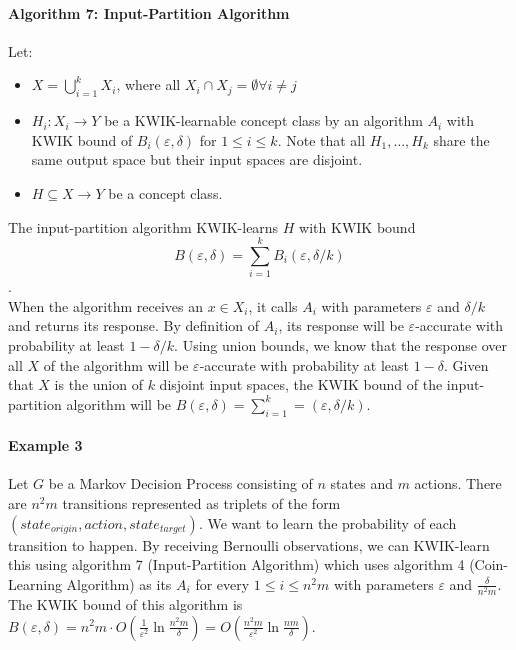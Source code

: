 \paragraph{Algorithm 7: Input-Partition Algorithm}
Let:
\begin{itemize}
  \item $X = \bigcup_{i=1}^k X_i$, where all $X_i \cap X_j = \emptyset \forall i \neq j$
  \item $H_i: X_i \to Y$ be a KWIK-learnable concept class by an algorithm $A_i$
  with KWIK bound of $B_i(\varepsilon, \delta)$ for $1 \leq i \leq k$. Note
  that all $H_1, \ldots, H_k$ share the same output space but their input spaces
  are disjoint.
  \item $H \subseteq X \to Y$ be a concept class.
\end{itemize}

The input-partition algorithm KWIK-learns $H$ with KWIK bound $$B(\varepsilon,
\delta) = \sum_{i=1}^k B_i(\varepsilon, \delta/k)$$. \\

When the algorithm receives an $x \in X_i$, it calls $A_i$ with parameters
$\varepsilon$ and $\delta/k$ and returns its response. By definition of $A_i$,
its response will be $\varepsilon$-accurate with probability at least $1 -
\delta/k$. Using union bounds, we know that the response over all $X$ of the
algorithm will be $\varepsilon$-accurate with probability at least $1 - \delta$.
Given that $X$ is the union of $k$ disjoint input spaces, the KWIK bound
of the input-partition algorithm will be $B(\varepsilon, \delta) = \sum_{i=1}^k
= (\varepsilon, \delta/k)$.

\paragraph{Example 3} Let $G$ be a Markov Decision Process consisting of $n$
states and $m$ actions. There are $n^2m$ transitions represented as triplets of
the form $(state_{origin}, action, state_{target})$. We want to learn the
probability of each transition to happen. By receiving Bernoulli observations,
we can KWIK-learn this using algorithm 7 (Input-Partition Algorithm) which
uses algorithm 4 (Coin-Learning Algorithm) as its $A_i$ for every $1 \leq i \leq
n^2m$ with parameters $\varepsilon$ and $\frac{\delta}{n^2m}$. The KWIK bound of
this algorithm is $B(\varepsilon, \delta) = n^2m \cdot O(\frac{1}{\varepsilon^2}
\ln \frac{n^2m}{\delta}) = O(\frac{n^2m}{\varepsilon^2} \ln \frac{nm}{\delta})$.


